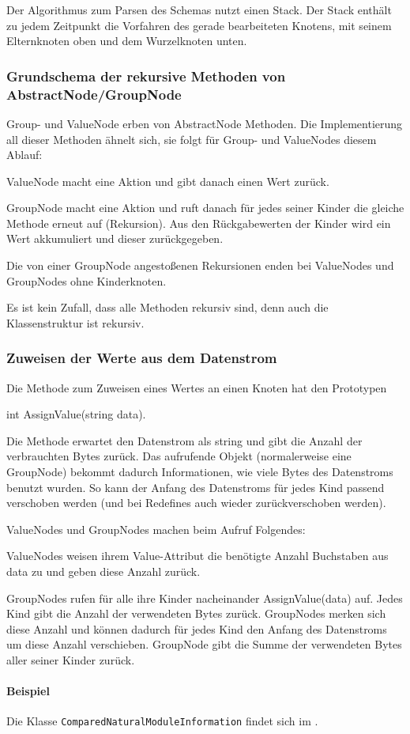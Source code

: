 Der Algorithmus zum Parsen des Schemas nutzt einen Stack. Der Stack enthält zu jedem Zeitpunkt die Vorfahren des gerade bearbeiteten Knotens, mit seinem Elternknoten oben und dem Wurzelknoten unten.



\subsubsection{Grundschema der rekursive Methoden von AbstractNode/GroupNode}
Group- und ValueNode erben von AbstractNode Methoden. Die Implementierung all dieser Methoden ähnelt sich, sie folgt für Group- und ValueNodes diesem Ablauf:

ValueNode macht eine Aktion und gibt danach einen Wert zurück.

GroupNode macht eine Aktion und ruft danach für jedes seiner Kinder die gleiche Methode erneut auf (Rekursion). Aus den Rückgabewerten der Kinder wird ein Wert akkumuliert und dieser zurückgegeben.

Die von einer GroupNode angestoßenen Rekursionen enden bei ValueNodes und GroupNodes ohne Kinderknoten.

Es ist kein Zufall, dass alle Methoden rekursiv sind, denn auch die Klassenstruktur ist rekursiv.

\subsubsection{Zuweisen der Werte aus dem Datenstrom}
Die Methode zum Zuweisen eines Wertes an einen Knoten hat den Prototypen 

int AssignValue(string data).

Die Methode erwartet den Datenstrom als string und gibt die Anzahl der verbrauchten Bytes zurück. Das aufrufende Objekt (normalerweise eine GroupNode) bekommt dadurch Informationen, wie viele Bytes des Datenstroms benutzt wurden. So kann der Anfang des Datenstroms für jedes Kind passend verschoben werden (und bei Redefines auch wieder zurückverschoben werden).

ValueNodes und GroupNodes machen beim Aufruf Folgendes:

ValueNodes weisen ihrem Value-Attribut die benötigte Anzahl Buchstaben aus data zu und geben diese Anzahl zurück.


GroupNodes rufen für alle ihre Kinder nacheinander AssignValue(data) auf. Jedes Kind gibt die Anzahl der verwendeten Bytes zurück. GroupNodes merken sich diese Anzahl und können dadurch für jedes Kind den Anfang des Datenstroms um diese Anzahl verschieben. GroupNode gibt die Summe der verwendeten Bytes aller seiner Kinder zurück.

\paragraph{Beispiel}
Die Klasse \texttt{Com\-par\-ed\-Na\-tu\-ral\-Mo\-dule\-In\-for\-ma\-tion} findet sich im .  






